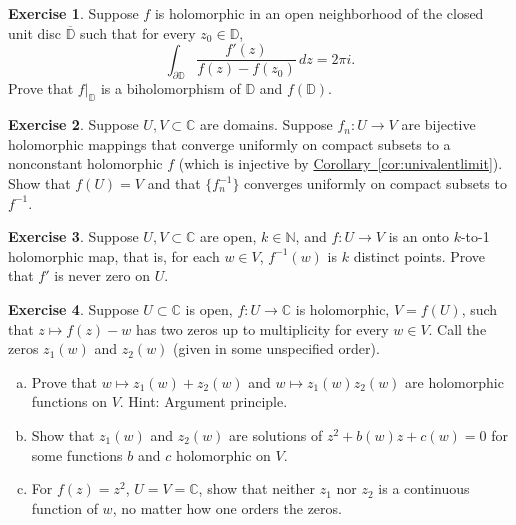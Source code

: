 \documentclass[12pt,openany]{book}
\newcommand{\C}{{\mathbb{C}}}
\newcommand{\N}{{\mathbb{N}}}
\newcommand{\D}{{\mathbb{D}}}
\theoremstyle{plain}
\theoremstyle{remark}
\theoremstyle{definition}
\newenvironment{exbox}{%
    \def\FrameCommand{\vrule width 1pt \relax\hspace{10pt}}%
    \MakeFramed{\advance\hsize-\width\FrameRestore}%
}{%
    \endMakeFramed
}
\newenvironment{exparts}{%
    \leavevmode\begin{enumerate}[a),noitemsep,topsep=0pt,parsep=0pt,partopsep=0pt]
}{%
    \end{enumerate}
}
\theoremstyle{exercise}
\newtheorem{exercise}{Exercise}[section]
\theoremstyle{example}
\newcommand{\corref}[1]{\hyperref[#1]{Corollary~\ref*{#1}}}
\begin{document}
\begin{exbox}
\begin{exercise}
Suppose $f$ is holomorphic in an open neighborhood of the closed unit disc
$\overline{\D}$ such that for every $z_0 \in \D$,
\begin{equation*}
\int_{\partial \D}
\frac{f'(z)}{f(z)-f(z_0)}
\, dz = 2\pi i .
\end{equation*}
Prove that $f|_{\D}$ is a biholomorphism of $\D$ and $f(\D)$.
\end{exercise}

\begin{exercise}
Suppose $U,V \subset \C$ are domains.
Suppose $f_n \colon U \to V$ are bijective holomorphic mappings
that converge uniformly on compact subsets to a nonconstant
holomorphic $f$ (which is injective by \corref{cor:univalentlimit}).
Show that $f(U) = V$ and that $\bigl\{ f_n^{-1} \bigr\}$ converges uniformly on
compact subsets to $f^{-1}$.
\end{exercise}

\begin{exercise} \label{exercise:ktoone}
Suppose $U,V \subset \C$ are open, $k \in \N$, and $f \colon U \to V$ is an
onto $k$-to-1
holomorphic map, that is, for each $w \in V$, $f^{-1}(w)$ is $k$ distinct
points.  Prove that $f'$ is never zero on $U$.
\end{exercise}

\begin{exercise}
Suppose $U \subset \C$ is open, $f \colon U \to \C$ is
holomorphic, $V = f(U)$, such that $z \mapsto f(z)-w$
has two zeros up to multiplicity for every $w \in V$.
Call the zeros
$z_1(w)$ and $z_2(w)$ (given in some unspecified order).
\begin{exparts}
\item
Prove that $w \mapsto z_1(w)+z_2(w)$ and 
$w \mapsto z_1(w)z_2(w)$ are holomorphic functions on $V$.
Hint: Argument principle.
\item
Show that $z_1(w)$ and $z_2(w)$ are solutions of
$z^2 + b(w) z + c(w) = 0$ for some functions $b$ and $c$ holomorphic on $V$.
\item
For $f(z) = z^2$, $U = V = \C$, show that neither $z_1$ nor $z_2$ is a continuous
function of $w$,
no matter how one orders the zeros.
\end{exparts}
\end{exercise}
\end{exbox}


\end{document}
